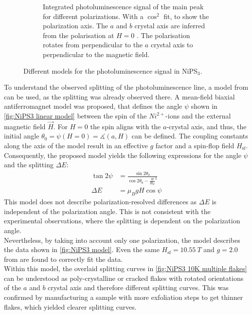 \documentclass[
	twoside,
	parskip=half,
	a4paper,
]{scrbook}
\begin{document}
\begin{figure}
\begin{subfigure}[t]{3in}
		\caption{
			Integrated photoluminescence signal of the main peak for different polarizations. 
			With a $\cos^2$ fit, to show the polarization axis. 
			The $a$ and $b$ crystal axis are inferred from the polarisation at $H=0$ \cite{NiPS3_linear}.
			The polarisation rotates from perpendicular to the $a$ crystal axis to perpendicular to the magnetic field. 
		}
		\label{fig:NiPS3 polarisation peanut}
	\end{subfigure}
	\caption{Different models for the photoluminescence signal in NiPS$_3$.}
\end{figure}
To understand the observed splitting of the photoluminescence line, a model from \cite{NiPS3_magnon_gap} can be used, as the splitting was already observed there. 
A mean-field biaxial antiferromagnet model was proposed, that defines the angle $\psi$ shown in \autoref{fig:NiPS3 linear model} between the spin of the $Ni^{2+}$-ions and the external magnetic field $\vec{H}$.
For $H=0$ the spin aligns with the $a$-crystal axis, and thus, the initial angle $\theta_0=\psi\left(H=0\right)=\measuredangle(a, H)$ can be defined.
The coupling constants along the axis of the model result in an effective $g$ factor and a spin-flop field $H_\text{sf}$.
Consequently, the proposed model \autocite{NiPS3_magnon_gap} yields the following expressions for the angle $\psi$ and the splitting $\Delta E$:
\begin{align}
	\tan 2\psi &= \frac{\sin 2\theta_0}{\cos 2\theta_0 - \frac{H}{H_\text{sf}}^2}\\
	\Delta E &= \mu_B g H \cos \psi
	\label{eq:NiPS3 model}
\end{align}
This model does not describe polarization-resolved differences as $\Delta E$ is independent of the polarization angle.
This is not consistent with the experimental observations, where the splitting is dependent on the polarization angle.\\
Nevertheless, by taking into account only one polarization, the model describes the data shown in \autoref{fig:NiPS3 model}.
Even the same $H_\text{sf} = \SI{10.55}{T}$ and $g=\SI{2.0}{}$ from \autocite{NiPS3_magnon_gap} are found to correctly fit the data.\\
Within this model, the overlaid splitting curves in \autoref{fig:NiPS3 10K multiple flakes} can be understood as poly-crystalline or cracked flakes with rotated orientations of the $a$ and $b$ crystal axis and therefore different splitting curves.
This was confirmed by manufacturing a sample with more exfoliation steps to get thinner flakes, which yielded clearer splitting curves.
\end{document}
